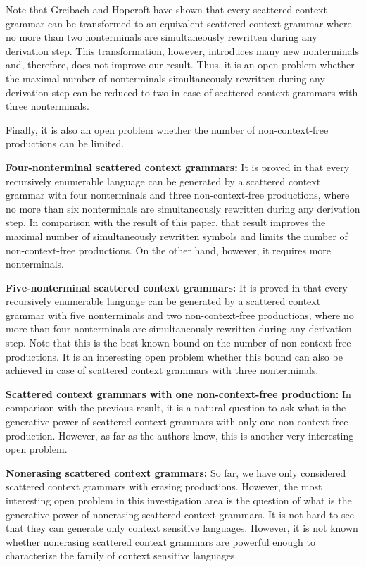 \documentclass[copyright]{eptcs}
\begin{document}
  Note that Greibach and Hopcroft \cite{GreHop} have shown that every scattered context grammar can be transformed to an equivalent scattered context grammar where no more than two nonterminals are simultaneously rewritten during any derivation step. This transformation, however, introduces many new nonterminals and, therefore, does not improve our result. Thus, it is an open problem whether the maximal number of nonterminals simultaneously rewritten during any derivation step can be reduced to two in case of scattered context grammars with three nonterminals.

  Finally, it is also an open problem whether the number of non-context-free productions can be limited.

  {\bf Four-nonterminal scattered context grammars:}
  It is proved in \cite{masopustTCS} that every recursively enumerable language can be generated by a scattered context grammar with four nonterminals and three non-context-free productions, where no more than six nonterminals are simultaneously rewritten during any derivation step. In comparison with the result of this paper, that result improves the maximal number of simultaneously rewritten symbols and limits the number of non-context-free productions. On the other hand, however, it requires more nonterminals.

  {\bf Five-nonterminal scattered context grammars:}
  It is proved in \cite{vaszil} that every recursively enumerable language can be generated by a scattered context grammar with five nonterminals and two non-context-free productions, where no more than four nonterminals are simultaneously rewritten during any derivation step. Note that this is the best known bound on the number of non-context-free productions. It is an interesting open problem whether this bound can also be achieved in case of scattered context grammars with three nonterminals.

  {\bf Scattered context grammars with one non-context-free production:}
  In comparison with the previous result, it is a natural question to ask what is the generative power of scattered context grammars with only one non-context-free production. However, as far as the authors know, this is another very interesting open problem.

  {\bf Nonerasing scattered context grammars:}
  So far, we have only considered scattered context grammars with erasing productions. However, the most interesting open problem in this investigation area is the question of what is the generative power of nonerasing scattered context grammars. It is not hard to see that they can generate only context sensitive languages. However, it is not known whether nonerasing scattered context grammars are powerful enough to characterize the family of context sensitive languages.
\end{document}
